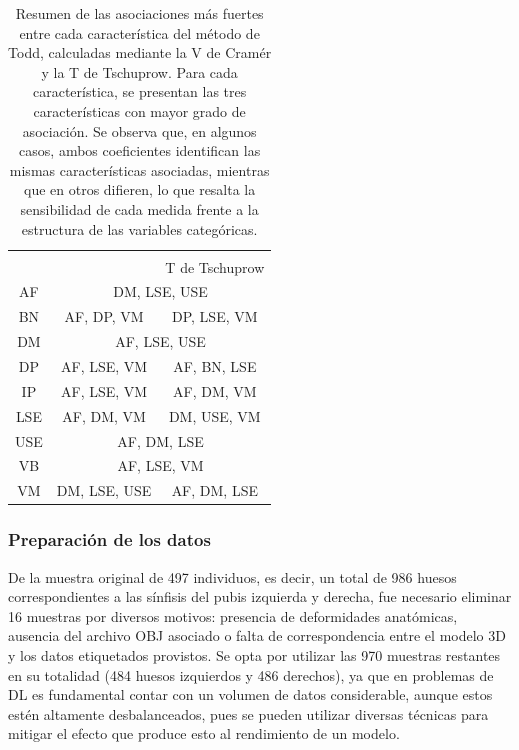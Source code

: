 \begin{table}[t]
    \centering
    \begin{tabular}{|c|cc|}
        \hline
        \rowcolor[HTML]{D33333} 
        \cellcolor[HTML]{D33333}{\color[HTML]{FFFFFF} } & \multicolumn{2}{c|}{\cellcolor[HTML]{D33333}{\color[HTML]{FFFFFF} Características con mayor asociación}} \\ \cline{2-3} 
        \rowcolor[HTML]{D33333} 
        \multirow{-2}{*}{\cellcolor[HTML]{D33333}{\color[HTML]{FFFFFF} Característica}} & \multicolumn{1}{c|}{\cellcolor[HTML]{D33333}{\color[HTML]{FFFFFF} V de Cramér}} & {\color[HTML]{FFFFFF} T de Tschuprow} \\ \hline
        AF & \multicolumn{2}{c|}{DM, LSE, USE} \\ \cline{2-3} 
        BN & \multicolumn{1}{c|}{AF, DP, VM} & DP, LSE, VM \\ \cline{2-3} 
        DM & \multicolumn{2}{c|}{AF, LSE, USE} \\ \cline{2-3} 
        DP & \multicolumn{1}{c|}{AF, LSE, VM} & AF, BN, LSE \\
        IP & \multicolumn{1}{c|}{AF, LSE, VM} & AF, DM, VM \\
        LSE & \multicolumn{1}{c|}{AF, DM, VM} & DM, USE, VM \\ \cline{2-3} 
        USE & \multicolumn{2}{c|}{AF, DM, LSE} \\ \cline{2-3} 
        VB & \multicolumn{2}{c|}{AF, LSE, VM} \\ \cline{2-3} 
        VM & \multicolumn{1}{c|}{DM, LSE, USE} & AF, DM, LSE \\ \hline
    \end{tabular}
    \caption[Cuadro resumen de las asociaciones más fuertes entre características de Todd]{Resumen de las asociaciones más fuertes entre cada característica del método de Todd, calculadas mediante la V de Cramér y la T de Tschuprow. Para cada característica, se presentan las tres características con mayor grado de asociación. Se observa que, en algunos casos, ambos coeficientes identifican las mismas características asociadas, mientras que en otros difieren, lo que resalta la sensibilidad de cada medida frente a la estructura de las variables categóricas.}
    \label{table4:corr}
\end{table}

\subsubsection{Preparación de los datos}
\label{section4:data_preparation}
De la muestra original de 497 individuos, es decir, un total de 986 huesos correspondientes a las sínfisis del pubis izquierda y derecha, fue necesario eliminar 16 muestras por diversos motivos: presencia de deformidades anatómicas, ausencia del archivo OBJ asociado o falta de correspondencia entre el modelo 3D y los datos etiquetados provistos. Se opta por utilizar las 970 muestras restantes en su totalidad (484 huesos izquierdos y 486 derechos), ya que en problemas de DL es fundamental contar con un volumen de datos considerable, aunque estos estén altamente desbalanceados, pues se pueden utilizar diversas técnicas para mitigar el efecto que produce esto al rendimiento de un modelo. 


